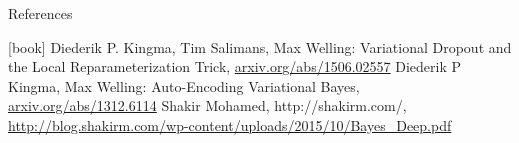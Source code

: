 \documentclass{beamer}
\begin{document}
\begin{frame}{References}

		\begin{thebibliography}{9}
			[book]
			 Diederik P. Kingma, Tim Salimans, Max Welling: Variational Dropout and the Local Reparameterization Trick, \href{arxiv.org/abs/1506.02557}{arxiv.org/abs/1506.02557}
			 Diederik P Kingma, Max Welling: Auto-Encoding Variational Bayes, \href{arxiv.org/abs/1312.6114}{arxiv.org/abs/1312.6114}
			 Shakir Mohamed, http://shakirm.com/,  \href{http://blog.shakirm.com/wp-content/uploads/2015/10/Bayes_Deep.pdf}{http://blog.shakirm.com/wp-content/uploads/2015/10/Bayes_Deep.pdf}
		\end{thebibliography}
\end{frame}
\end{document}
